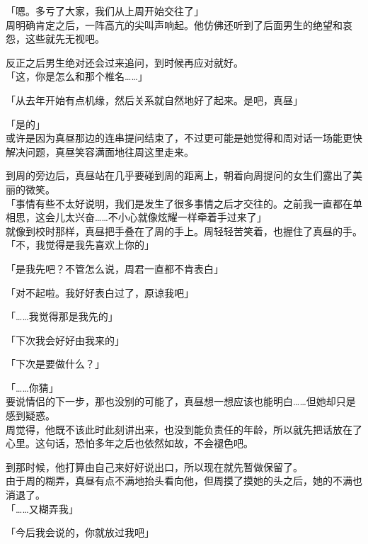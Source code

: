 「嗯。多亏了大家，我们从上周开始交往了」\\

周明确肯定之后，一阵高亢的尖叫声响起。他仿佛还听到了后面男生的绝望和哀怨，这些就先无视吧。

反正之后男生绝对还会过来追问，到时候再应对就好。\\

「这，你是怎么和那个椎名……」

「从去年开始有点机缘，然后关系就自然地好了起来。是吧，真昼」

「是的」\\

或许是因为真昼那边的连串提问结束了，不过更可能是她觉得和周对话一场能更快解决问题，真昼笑容满面地往周这里走来。

到周的旁边后，真昼站在几乎要碰到周的距离上，朝着向周提问的女生们露出了美丽的微笑。\\

「事情有些不太好说明，我们是发生了很多事情之后才交往的。之前我一直都在单相思，这会儿太兴奋……不小心就像炫耀一样牵着手过来了」\\

就像到校时那样，真昼把手叠在了周的手上。周轻轻苦笑着，也握住了真昼的手。\\

「不，我觉得是我先喜欢上你的」

「是我先吧？不管怎么说，周君一直都不肯表白」

「对不起啦。我好好表白过了，原谅我吧」

「……我觉得那是我先的」

「下次我会好好由我来的」

「下次是要做什么？」

「……你猜」\\

要说情侣的下一步，那也没别的可能了，真昼想一想应该也能明白……但她却只是感到疑惑。\\

周觉得，他既不该此时此刻讲出来，也没到能负责任的年龄，所以就先把话放在了心里。这句话，恐怕多年之后也依然如故，不会褪色吧。

到那时候，他打算由自己来好好说出口，所以现在就先暂做保留了。\\

由于周的糊弄，真昼有点不满地抬头看向他，但周摸了摸她的头之后，她的不满也消退了。\\

「……又糊弄我」

「今后我会说的，你就放过我吧」

